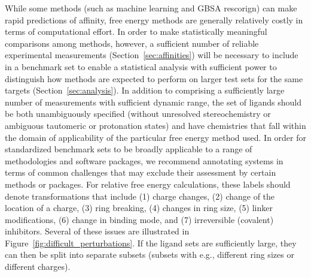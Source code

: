 \documentclass[9pt,bestpractices]{livecoms}
\begin{document}
While some methods (such as machine learning and GBSA rescorign) can make rapid predictions of affinity, free energy methods are generally relatively costly in terms of computational effort. 
In order to make statistically meaningful comparisons among methods, however, a sufficient number of reliable experimental measurements (Section~\ref{sec:affinities}) will be necessary to include in a benchmark set to enable a statistical analysis with sufficient power to distinguish how methods are expected to perform on larger test sets for the same targets (Section~\ref{sec:analysis}).
In addition to comprising a sufficiently large number of measurements with sufficient dynamic range, the set of ligands should be both unambiguously specified (without unresolved stereochemistry or ambiguous tautomeric or protonation states) and have chemistries that fall within the domain of applicability of the particular free energy method used. 
%
In order for standardized benchmark sets to be broadly applicable to a range of methodologies and software packages, we recommend annotating systems in terms of common challenges that may exclude their assessment by certain methods or packages.
For relative free energy calculations, these labels should denote transformations that include
(1) charge changes, 
(2) change of the location of a charge,
(3) ring breaking,
(4) changes in ring size, 
(5) linker modifications,
(6) change in binding mode, 
and (7) irreversible (covalent) inhibitors. 
Several of these issues are illustrated in Figure~\ref{fig:difficult_perturbations}.
%
If the ligand sets are sufficiently large, they can then be split into separate subsets (subsets with e.g., different ring sizes or different charges).
\end{document}
